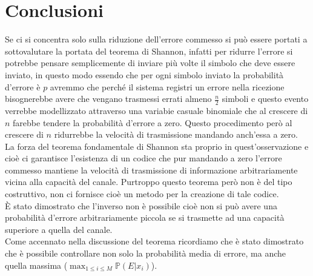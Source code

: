 \chapter{Conclusioni}
\label{cha:conclusioni}
Se ci si concentra solo sulla riduzione dell'errore commesso si può essere portati a sottovalutare la portata del teorema di Shannon, infatti per ridurre l'errore si potrebbe pensare semplicemente di inviare più volte il simbolo che deve essere inviato, in questo modo essendo che per ogni simbolo inviato la probabilità d'errore è $p$ avremmo che perché il sistema registri un errore nella ricezione bisognerebbe avere che vengano trasmessi errati almeno $\frac{n}{2}$ simboli e questo evento verrebbe modellizzato attraverso una variabie casuale binomiale che al crescere di $n$ farebbe tendere la probabilità d'errore a zero. Questo procedimento però al crescere di $n$ ridurrebbe la velocità di trasmissione mandando anch'essa a zero. La forza del teorema fondamentale di Shannon sta proprio in quest'osservazione e cioè ci garantisce l'esistenza di un codice che pur mandando a zero l'errore commesso mantiene la velocità di trasmissione di informazione arbitrariamente vicina alla capacità del canale. Purtroppo questo teorema però non è del tipo costruttivo, non ci fornisce cioè un metodo per la creazione di tale codice.\\
È stato dimostrato che l'inverso non è possibile cioè non si può avere una probabilità d'errore arbitrariamente piccola se si trasmette ad una capacità superiore a quella del canale.\\
Come accennato nella discussione del teorema ricordiamo che  è stato dimostrato che è possibile controllare non solo la probabilità media di errore, ma anche quella massima ($\max_{1\leq i \leq M} \mathbb{P}(E|x_i)$).\\







